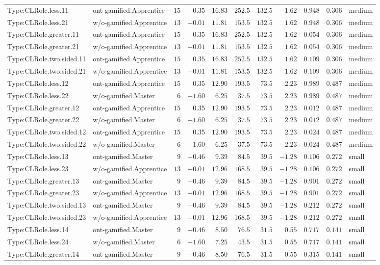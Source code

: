 \documentclass[6pt,a4paper]{article}
\begin{document}
{\begin{longtable}{llrrrrrrrrl}
Type:CLRole.less.11&ont-gamified.Apprentice&$15$&$ 0.35$&$16.83$&$252.5$&$132.5$&$ 1.62$&$0.948$&$0.306$&medium\tabularnewline
Type:CLRole.less.21&w/o-gamified.Apprentice&$13$&$-0.01$&$11.81$&$153.5$&$132.5$&$ 1.62$&$0.948$&$0.306$&medium\tabularnewline
Type:CLRole.greater.11&ont-gamified.Apprentice&$15$&$ 0.35$&$16.83$&$252.5$&$132.5$&$ 1.62$&$0.054$&$0.306$&medium\tabularnewline
Type:CLRole.greater.21&w/o-gamified.Apprentice&$13$&$-0.01$&$11.81$&$153.5$&$132.5$&$ 1.62$&$0.054$&$0.306$&medium\tabularnewline
Type:CLRole.two.sided.11&ont-gamified.Apprentice&$15$&$ 0.35$&$16.83$&$252.5$&$132.5$&$ 1.62$&$0.109$&$0.306$&medium\tabularnewline
Type:CLRole.two.sided.21&w/o-gamified.Apprentice&$13$&$-0.01$&$11.81$&$153.5$&$132.5$&$ 1.62$&$0.109$&$0.306$&medium\tabularnewline
Type:CLRole.less.12&ont-gamified.Apprentice&$15$&$ 0.35$&$12.90$&$193.5$&$ 73.5$&$ 2.23$&$0.989$&$0.487$&medium\tabularnewline
Type:CLRole.less.22&w/o-gamified.Master&$ 6$&$-1.60$&$ 6.25$&$ 37.5$&$ 73.5$&$ 2.23$&$0.989$&$0.487$&medium\tabularnewline
Type:CLRole.greater.12&ont-gamified.Apprentice&$15$&$ 0.35$&$12.90$&$193.5$&$ 73.5$&$ 2.23$&$0.012$&$0.487$&medium\tabularnewline
Type:CLRole.greater.22&w/o-gamified.Master&$ 6$&$-1.60$&$ 6.25$&$ 37.5$&$ 73.5$&$ 2.23$&$0.012$&$0.487$&medium\tabularnewline
Type:CLRole.two.sided.12&ont-gamified.Apprentice&$15$&$ 0.35$&$12.90$&$193.5$&$ 73.5$&$ 2.23$&$0.024$&$0.487$&medium\tabularnewline
Type:CLRole.two.sided.22&w/o-gamified.Master&$ 6$&$-1.60$&$ 6.25$&$ 37.5$&$ 73.5$&$ 2.23$&$0.024$&$0.487$&medium\tabularnewline
Type:CLRole.less.13&ont-gamified.Master&$ 9$&$-0.46$&$ 9.39$&$ 84.5$&$ 39.5$&$-1.28$&$0.106$&$0.272$&small\tabularnewline
Type:CLRole.less.23&w/o-gamified.Apprentice&$13$&$-0.01$&$12.96$&$168.5$&$ 39.5$&$-1.28$&$0.106$&$0.272$&small\tabularnewline
Type:CLRole.greater.13&ont-gamified.Master&$ 9$&$-0.46$&$ 9.39$&$ 84.5$&$ 39.5$&$-1.28$&$0.901$&$0.272$&small\tabularnewline
Type:CLRole.greater.23&w/o-gamified.Apprentice&$13$&$-0.01$&$12.96$&$168.5$&$ 39.5$&$-1.28$&$0.901$&$0.272$&small\tabularnewline
Type:CLRole.two.sided.13&ont-gamified.Master&$ 9$&$-0.46$&$ 9.39$&$ 84.5$&$ 39.5$&$-1.28$&$0.212$&$0.272$&small\tabularnewline
Type:CLRole.two.sided.23&w/o-gamified.Apprentice&$13$&$-0.01$&$12.96$&$168.5$&$ 39.5$&$-1.28$&$0.212$&$0.272$&small\tabularnewline
Type:CLRole.less.14&ont-gamified.Master&$ 9$&$-0.46$&$ 8.50$&$ 76.5$&$ 31.5$&$ 0.55$&$0.717$&$0.141$&small\tabularnewline
Type:CLRole.less.24&w/o-gamified.Master&$ 6$&$-1.60$&$ 7.25$&$ 43.5$&$ 31.5$&$ 0.55$&$0.717$&$0.141$&small\tabularnewline
Type:CLRole.greater.14&ont-gamified.Master&$ 9$&$-0.46$&$ 8.50$&$ 76.5$&$ 31.5$&$ 0.55$&$0.315$&$0.141$&small\tabularnewline

\end{longtable}}
\end{document}
